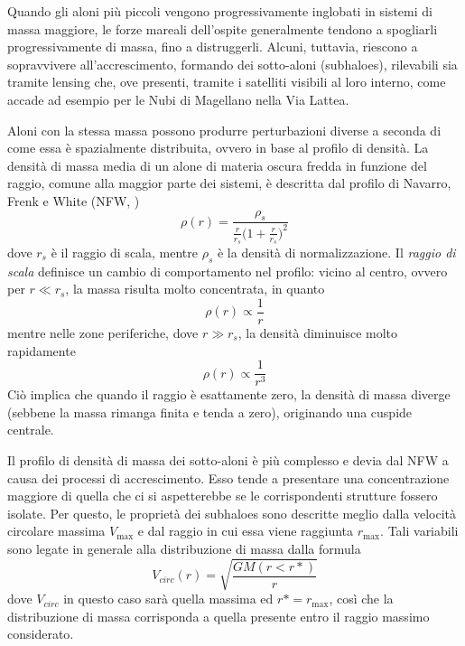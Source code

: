 Quando gli aloni più piccoli vengono progressivamente inglobati in sistemi di massa maggiore, le forze mareali dell'ospite generalmente tendono a spogliarli progressivamente di massa, fino a distruggerli. Alcuni, tuttavia, riescono a sopravvivere all'accrescimento, formando dei sotto-aloni (subhaloes), rilevabili sia tramite lensing che, ove presenti, tramite i satelliti visibili al loro interno, come accade ad esempio per le Nubi di Magellano nella Via Lattea.

Aloni con la stessa massa possono produrre perturbazioni diverse a seconda di come essa è spazialmente distribuita, ovvero in base al profilo di densità.
La densità di massa media di un alone di materia oscura fredda in funzione del raggio, comune alla maggior parte dei sistemi, è descritta dal profilo di Navarro, Frenk e White (NFW, \cite{NavarroFrenk1996})
\begin{equation}
    \rho(r)=\frac{\rho_s}{\frac{r}{r_s}\Big(1+\frac{r}{r_s}\Big)^2}
    \label{eq:NFW}
\end{equation}
dove $r_s$ è il raggio di scala, mentre $\rho_s$ è la densità di normalizzazione. Il \emph{raggio di scala} definisce un cambio di comportamento nel profilo: vicino al centro, ovvero per $r\ll r_s$, la massa risulta molto concentrata, in quanto 
\begin{equation}
    \rho(r)\propto \frac{1}{r}
\end{equation}
mentre nelle zone periferiche, dove $r\gg r_s$, la densità diminuisce molto rapidamente 
\begin{equation}
      \rho(r)\propto \frac{1}{r^3}
\end{equation}
Ciò implica che quando il raggio è esattamente zero, la densità di massa diverge (sebbene la massa rimanga finita e tenda a zero), originando una cuspide centrale.

Il profilo di densità di massa dei sotto-aloni è più complesso e devia dal NFW a causa dei processi di accrescimento. Esso tende a presentare una concentrazione maggiore di quella che ci si aspetterebbe se le corrispondenti strutture fossero isolate. Per questo, le proprietà dei subhaloes sono descritte meglio dalla velocità circolare massima $V_{\max}$ e dal raggio in cui essa viene raggiunta $r_{\max}$.  Tali variabili sono legate in generale alla distribuzione di massa dalla formula
\begin{equation}
    V_{circ}(r)=\sqrt{\frac{GM(r<r*)}{r}}
\end{equation}
dove $V_{circ}$ in questo caso sarà quella massima ed $r*=r_{\max}$, così che la distribuzione di massa corrisponda a quella presente entro il raggio massimo considerato.
